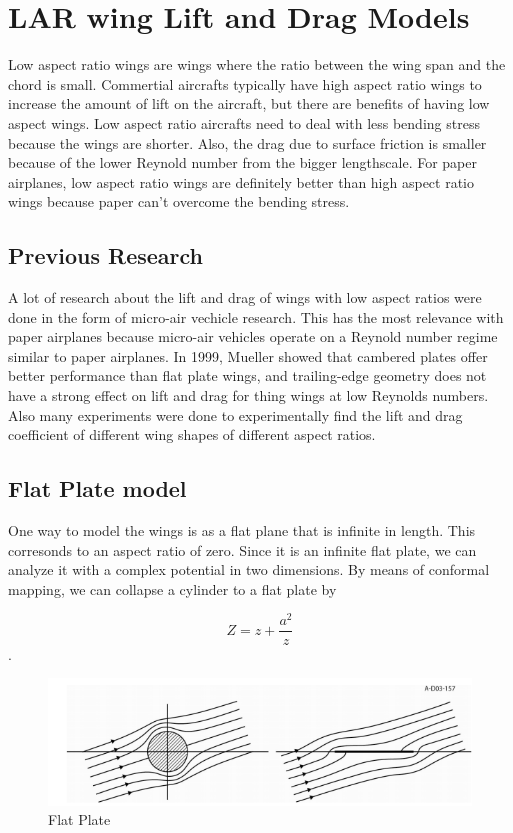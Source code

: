 
\section{LAR wing Lift and Drag Models}

Low aspect ratio wings are wings where the ratio between the wing span and
the chord is small. Commertial aircrafts typically have high aspect ratio wings
to increase the amount of lift on the aircraft, but there are benefits of having
low aspect wings. Low aspect ratio aircrafts need to deal with less bending
stress because the wings are shorter. Also, the drag due to surface friction is
smaller because of the lower Reynold number from the bigger lengthscale.
For paper airplanes, low aspect ratio wings are definitely better than high
aspect ratio wings because paper can't overcome the
bending stress.


\subsection{Previous Research}

A lot of research about the lift and drag of wings with low aspect ratios  were done in the form of
micro-air vechicle research. This has the most relevance with paper airplanes because
micro-air vehicles operate on a Reynold number regime similar to paper airplanes. 
In 1999, Mueller showed that cambered plates offer better performance than flat plate wings, and
trailing-edge geometry does not have a strong effect on lift and drag
for thing wings at low Reynolds numbers. Also many experiments were done to experimentally
find the lift and drag coefficient of different wing shapes of different aspect ratios.

\subsection{Flat Plate model}

One way to model the wings is as a flat plane that is infinite in length. This corresonds to
an aspect ratio of zero. Since it is
an infinite flat plate, we can analyze it with a complex potential in two dimensions.
By means of conformal mapping, we can collapse a cylinder to a flat plate by

\[Z = z + \frac{a^2}{z}\].

\begin{figure}[hl]
  \centering
    \includegraphics[scale=.5]{figures/flatplate1.png}
    \caption{Flat Plate}
  \label{fig:dihedraleffect}
\end{figure}

